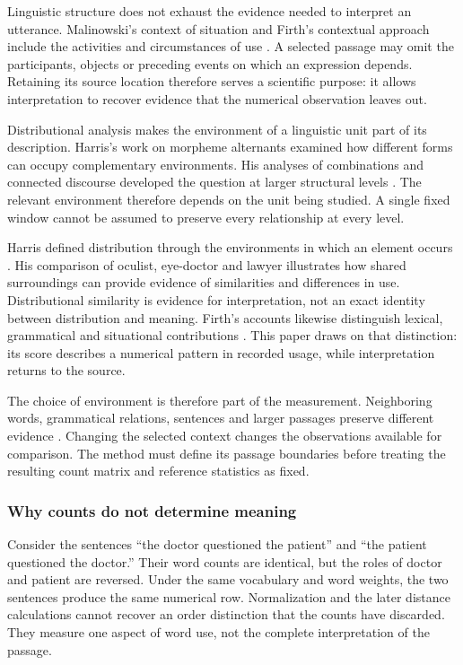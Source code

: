 \documentclass[10pt,letterpaper]{article}
\begin{document}
Linguistic structure does not exhaust the evidence needed to interpret an utterance. Malinowski's context of situation and Firth's contextual approach include the activities and circumstances of use \cite{malinowski,firth1935}. A selected passage may omit the participants, objects or preceding events on which an expression depends. Retaining its source location therefore serves a scientific purpose: it allows interpretation to recover evidence that the numerical observation leaves out.\par

Distributional analysis makes the environment of a linguistic unit part of its description. Harris's work on morpheme alternants examined how different forms can occupy complementary environments. His analyses of combinations and connected discourse developed the question at larger structural levels \cite{harris1942,harris1946,harris1951,harris1952}. The relevant environment therefore depends on the unit being studied. A single fixed window cannot be assumed to preserve every relationship at every level.\par

Harris defined distribution through the environments in which an element occurs \cite{harris}. His comparison of oculist, eye-doctor and lawyer illustrates how shared surroundings can provide evidence of similarities and differences in use. Distributional similarity is evidence for interpretation, not an exact identity between distribution and meaning. Firth's accounts likewise distinguish lexical, grammatical and situational contributions \cite{firth1951,firth}. This paper draws on that distinction: its score describes a numerical pattern in recorded usage, while interpretation returns to the source.\par

The choice of environment is therefore part of the measurement. Neighboring words, grammatical relations, sentences and larger passages preserve different evidence \cite{harris}. Changing the selected context changes the observations available for comparison. The method must define its passage boundaries before treating the resulting count matrix and reference statistics as fixed.\par

\subsubsection{Why counts do not determine meaning}
Consider the sentences “the doctor questioned the patient” and “the patient questioned the doctor.” Their word counts are identical, but the roles of doctor and patient are reversed. Under the same vocabulary and word weights, the two sentences produce the same numerical row. Normalization and the later distance calculations cannot recover an order distinction that the counts have discarded. They measure one aspect of word use, not the complete interpretation of the passage.\par
\end{document}
